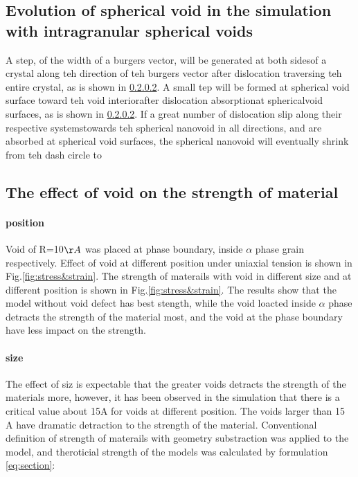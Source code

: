 \documentclass[journal,article,submit,moreauthors,pdftex,10pt,a4paper]{Definitions/mdpi}
\begin{document}
	
\subsection{Evolution of spherical void in the simulation with intragranular spherical voids}
A step, of the width of a burgers vector, will be generated at both sidesof a crystal along teh direction of teh burgers vector after dislocation traversing teh entire crystal, as is shown in \ref{}. A small tep will be formed at spherical void surface toward teh void interiorafter dislocation absorptionat sphericalvoid surfaces, as is shown in \ref{}. If a great number of dislocation slip along their respective systemstowards teh spherical nanovoid in all directions, and are absorbed at spherical void surfaces, the spherical nanovoid will eventually shrink from teh dash circle to
	
\subsection{The effect of void on the strength of material}
\paragraph{position} Void of R=10$\AA$ was placed at phase boundary, inside $\alpha$ phase grain respectively. Effect of void at different position under uniaxial tension is shown in Fig.\ref{fig:stress&strain}. The strength of materails with void in different size and at different position is shown in Fig.\ref{fig:stress&strain}. The results show that the model without void defect has best stength, while the void loacted inside $\alpha$ phase detracts the strength of the material most, and the void at the phase boundary have less impact on the strength.
	
\paragraph{size} The effect of siz is expectable that the greater voids detracts the strength of the materials more, however, it has been observed in the simulation that there is a critical value about 15A for voids at different position. The voids larger than 15 A have dramatic detraction to the strength of the material. Conventional definition of strength of materails with geometry substraction was applied to the model, and theroticial strength of the models was calculated by formulation \ref{eq:section}:
	
\end{document}
